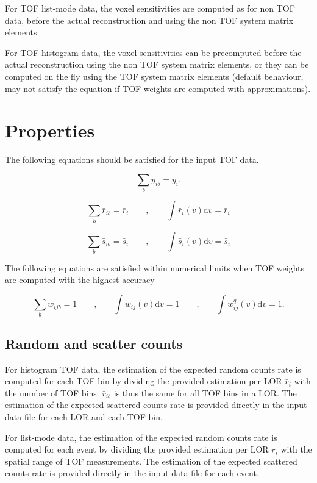 \documentclass[a4paper, 11pt]{article}
\begin{document}
For TOF list-mode data, the voxel sensitivities are computed as for non TOF data, before the actual reconstruction and using the non TOF system matrix elements.

For TOF histogram data, the voxel sensitivities can be precomputed before the actual reconstruction using the non TOF system matrix elements, or they can be computed on the fly using the TOF system matrix elements (default behaviour, may not satisfy the equation \label{sens} if TOF weights are computed with approximations).

\section{Properties}

The following equations should be satisfied for the input TOF data.

\begin{equation}
\sum_b y_{ib} = y_i.
\label{y_sum}
\end{equation}

\begin{equation}
\sum_b \bar{r}_{ib} = \bar{r}_i \qquad , \qquad \int \bar{r}_i(v)\mathrm{d}v = \bar{r}_i
\end{equation}

\begin{equation}
\sum_b \bar{s}_{ib} = \bar{s}_i \qquad , \qquad \int \bar{s}_i(v)\mathrm{d}v = \bar{s}_i
\end{equation}

The following equations are satisfied within numerical limits when TOF weights are computed with the highest accuracy

\begin{equation}
\sum_b w_{ijb} = 1 \qquad\mbox{,}\qquad \int w_{ij}(v)\mathrm{d}v = 1 \qquad\mbox{,} \qquad \int w^q_{ij}(v)\mathrm{d}v = 1.
\label{w_sum}
\end{equation}


\subsection{Random and scatter counts}

For histogram TOF data, the estimation of the expected random counts rate is computed for each TOF bin by dividing the provided estimation per LOR $\bar{r}_i$ with the number of TOF bins. $\bar{r}_{ib}$ is thus the same for all TOF bins in a LOR. The estimation of the expected scattered counts rate is provided directly in the input data file for each LOR and each TOF bin.

For list-mode data, the estimation of the expected random counts rate is computed for each event by dividing the provided estimation per LOR $r_i$ with the spatial range of TOF measurements. The estimation of the expected scattered counts rate is provided directly in the input data file for each event.
\end{document}

